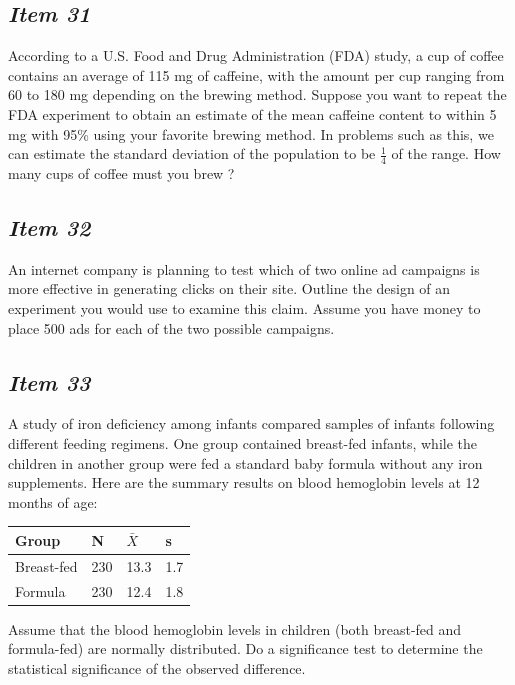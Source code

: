 \subsection{\textbf{\textit{Item 31}}}
According to a U.S. Food and Drug Administration (FDA) study, a cup of coffee contains an average of 115 mg of caffeine, with the amount per cup ranging from 60 to 180 mg depending on the brewing method.  Suppose you want to repeat the FDA experiment to obtain an estimate of the mean caffeine content to within 5 mg with 95\% using your favorite brewing method.  In problems such as this, we can estimate the standard deviation of the population to be $\frac{1}{4}$ of the range. How many cups of coffee must you brew ?  

\subsection{\textbf{\textit{Item 32}}}
An internet company is planning to test which of two online ad campaigns is more effective in generating clicks on their site.  Outline the design of an experiment you would use to examine this claim.  Assume you have money to place 500 ads for each of the two possible campaigns.

\subsection{\textbf{\textit{Item 33}}}
A study of iron deficiency among infants compared samples of infants following different feeding regimens.  One group contained breast-fed infants, while the children in another group were fed a standard baby formula without any iron supplements.  Here are the summary results on blood hemoglobin levels at 12 months of age:

\begin{table}[!ht]
\begin{center}
\begin{tabular}{llll}
\hline
Group & N & $\bar{X}$ & s\\
\hline
Breast-fed& 230 & 13.3 & 1.7\\
Formula & 230 & 12.4 & 1.8\\
\hline
\end{tabular}
\end{center}
\end{table}

Assume that the blood hemoglobin levels in children (both breast-fed and formula-fed) are normally distributed.  Do a significance test to determine the statistical significance of the observed difference.

